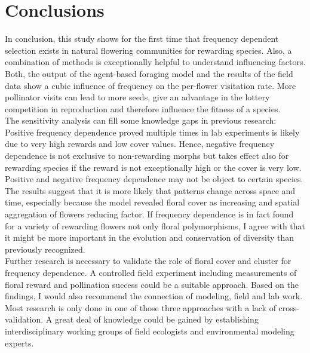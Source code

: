 \section{Conclusions}
\label{ch:conclusions}
In conclusion, this study shows for the first time that frequency dependent selection exists in natural flowering communities for rewarding species. Also, a combination of methods is exceptionally helpful to understand influencing factors. Both, the output of the agent-based foraging model and the results of the field data show a cubic influence of frequency on the per-flower visitation rate. More pollinator visits can lead to more seeds, give an advantage in the lottery competition in reproduction and therefore influence the fitness of a species. \\
The sensitivity analysis can fill some knowledge gaps in previous research: Positive frequency dependence proved multiple times in lab experiments is likely due to very high rewards and low cover values. Hence, negative frequency dependence is not exclusive to non-rewarding morphs but takes effect also for rewarding species if the reward is not exceptionally high or the cover is very low. \\
Positive and negative frequency dependence may not be object to certain species. The results suggest that it is more likely that patterns change across space and time, especially because the model revealed floral cover as increasing and spatial aggregation of flowers reducing factor. If frequency dependence is in fact found for a variety of rewarding flowers not only floral polymorphisms, I agree with \cite{Eckhart2006frequency} that it might be more important in the evolution and conservation of diversity than previously recognized.\\
Further research is necessary to validate the role of floral cover and cluster for frequency dependence. A controlled field experiment including measurements of floral reward and pollination success could be a suitable approach. Based on the findings, I would also recommend the connection of modeling, field and lab work. Most research is only done in one of those three approaches with a lack of cross-validation. A great deal of knowledge could be gained by establishing interdisciplinary working groups of field ecologists and environmental modeling experts. \\
